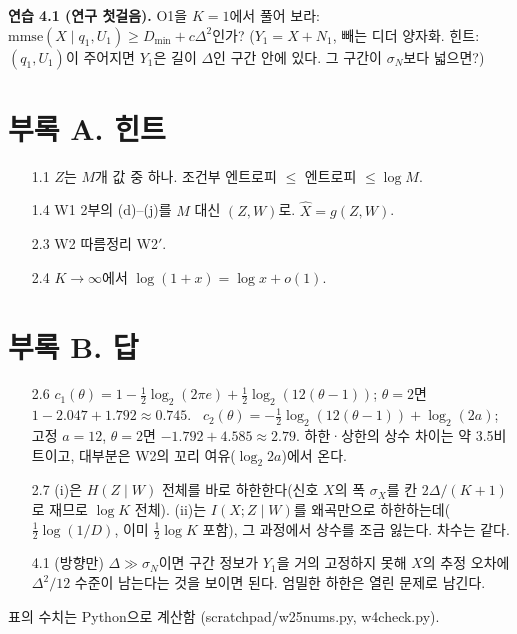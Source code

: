 \textbf{연습 4.1 (연구 첫걸음).} O1을 $K=1$에서 풀어 보라: $\mathrm{mmse}(X\mid q_1,U_1)\ge D_{\min}+c\Delta^2$인가? ($Y_1=X+N_1$, 빼는 디더 양자화. 힌트: $(q_1,U_1)$이 주어지면 $Y_1$은 길이 $\Delta$인 구간 안에 있다. 그 구간이 $\sigma_N$보다 넓으면?)
\vspace{6em}

\newpage
\section*{부록 A. 힌트}
\begin{itemize}[leftmargin=2.2em]
\item[1.1] $Z$는 $M$개 값 중 하나. 조건부 엔트로피 $\le$ 엔트로피 $\le\log M$.
\item[1.4] W1 2부의 (d)–(j)를 $M$ 대신 $(Z,W)$로. $\hat X=g(Z,W)$.
\item[2.3] W2 따름정리 W2$'$.
\item[2.4] $K\to\infty$에서 $\log(1+x)=\log x+o(1)$.
\end{itemize}

\section*{부록 B. 답}
\begin{itemize}[leftmargin=2.2em]
\item[2.6] $c_1(\theta)=1-\frac12\log_2(2\pi e)+\frac12\log_2(12(\theta-1))$; $\theta=2$면 $1-2.047+1.792\approx0.745$. \ $c_2(\theta)=-\frac12\log_2(12(\theta-1))+\log_2(2a)$; 고정 $a=12$, $\theta=2$면 $-1.792+4.585\approx2.79$. 하한·상한의 상수 차이는 약 3.5비트이고, 대부분은 W2의 꼬리 여유($\log_2 2a$)에서 온다.
\item[2.7] (i)은 $H(Z\mid W)$ 전체를 바로 하한한다(신호 $X$의 폭 $\sigma_X$를 칸 $2\Delta/(K+1)$로 재므로 $\log K$ 전체). (ii)는 $I(X;Z\mid W)$를 왜곡만으로 하한하는데($\frac12\log(1/D)$, 이미 $\frac12\log K$ 포함), 그 과정에서 상수를 조금 잃는다. 차수는 같다.
\item[4.1] (방향만) $\Delta\gg\sigma_N$이면 구간 정보가 $Y_1$을 거의 고정하지 못해 $X$의 추정 오차에 $\Delta^2/12$ 수준이 남는다는 것을 보이면 된다. 엄밀한 하한은 열린 문제로 남긴다.
\end{itemize}
\vspace{1em}
\small\textcolor{ink!60}{표의 수치는 Python으로 계산함 (scratchpad/w25nums.py, w4check.py).}

